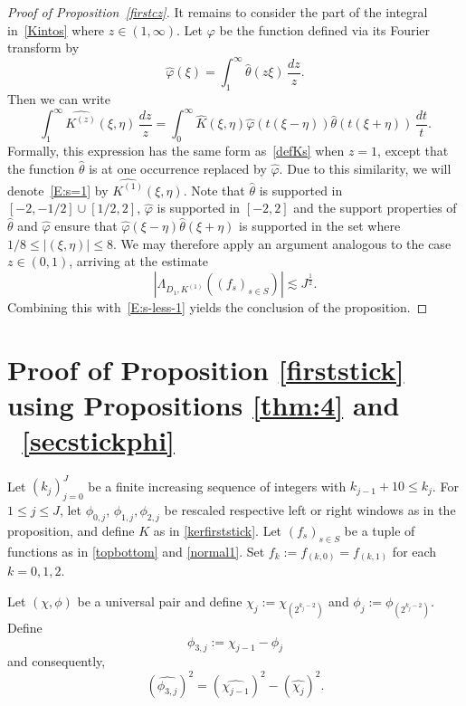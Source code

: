 \documentclass[12pt,reqno]{amsart}
\theoremstyle{plain}
\theoremstyle{definition}
\numberwithin{equation}{section}
\def\wh{\widehat}
\begin{document}
\begin{proof}[Proof of Proposition~\ref{firstcz}]
It remains to consider the part of the integral in~\eqref{Kintos} where $z\in (1,\infty)$. Let $\varphi$ be the function defined via its Fourier transform by \[\wh{\varphi}(\xi)=\int_1^\infty  \wh{\theta}(z\xi) \,\frac{dz}{z}.\] Then we can write
\begin{equation}\label{E:s=1}
\int_1^\infty \wh{K^{(z)}} (\xi,\eta)\,\frac{dz}{z}
=\int_0^\infty 
\wh{K}(\xi,\eta) \wh{\varphi}(t(\xi-\eta)) \wh{\theta}(t(\xi+\eta))\,
\frac{dt}{t}.
\end{equation}
Formally, this expression has the same form as~\eqref{defKs} when $z=1$, except that the function $\wh{\theta}$ is at one occurrence replaced by $\wh{\varphi}$. 
Due to this similarity, we will denote~\eqref{E:s=1} by $\wh{K^{(1)}}(\xi,\eta)$. Note that 
$\wh{\theta}$ is supported in $[-2,-1/2] \cup [1/2,2]$, $\wh{\varphi}$ is supported in $[-2,2]$ and the support properties of $\wh{\theta}$ and $\wh{\varphi}$ ensure that $\wh{\varphi}(\xi-\eta) \wh{\theta}(\xi+\eta)$ is supported in the set where $1/8 \leq |(\xi,\eta)| \leq 8$. We may therefore apply an argument analogous to the case $z\in (0,1)$, arriving at the estimate
\[
|\Lambda_{D_1,K^{(1)}}((f_s)_{s\in S})| \lesssim J^{\frac{1}{2}}.
\]
Combining this with~\eqref{E:s-less-1} yields the conclusion of the proposition.
\end{proof}




\section{Proof of Proposition \ref{firststick} using Propositions \ref{thm:4} and ~\ref{secstickphi}}
\label{sec:firststick}



Let $(k_j)_{j=0}^J$ be a finite increasing sequence of integers with $k_{j-1}+10 \leq k_{j}$. For $1\le j\le J$, let $\phi_{0,j}$, $\phi_{1,j},\phi_{2,j}$
be rescaled respective left or right windows as in the proposition,
and define $K$ as in \eqref{kerfirststick}.
Let  $(f_s)_{s\in S}$ be a tuple of functions as in
\eqref{topbottom} and \eqref{normal1}. 
Set $f_{k}:=f_{(k,0)}=f_{(k,1)}$ for each $k=0,1,2$.


Let  {$({\chi},\phi)$} be  a universal pair and define
$\chi_j:=\chi_{(2^{k_j-2})}$ and $\phi_j:=\phi_{(2^{k_j-2})}$. 
Define 
\begin{equation}
    \label{phi3}
    {\phi_{3,j}}:={\chi_{j-1}}-{\phi_j}
\end{equation}  
and consequently, 
\begin{equation*}
    (\widehat{\phi_{3,j}})^2 =(\widehat{\chi_{{j-1}}})^2- (\widehat{\chi_{{j}}})^2 .
\end{equation*}
\end{document}
